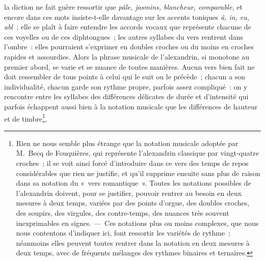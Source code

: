 \documentclass[french,twoside]{book} %
\begin{document}
\noindent la diction ne fait guère ressortir que \emph{pâle, jasmins, blancheur, comparable}, et encore dans ces mots insiste-t-elle davantage sur les accents toniques \emph{â, in, eu, abl} ; elle se plaît à faire entendre les accords vocaux que représente chacune de ces voyelles ou de ces diphtongues ; les autres syllabes du vers rentrent dans l’ombre : elles pourraient s’exprimer en doubles croches ou du moins en croches rapides et assourdies. Alors la phrase musicale de l’alexandrin, si monotone au premier abord, se varie et se nuance de toutes manières. Aucun vers bien fait ne doit ressembler de tous points à celui qui le suit ou le précède ; chacun a son individualité, chacun garde son rythme propre, parfois assez compliqué : on y rencontre entre les syllabes des différences délicates de durée et d’intensité qui parfois  échappent aussi bien à la notation musicale que les différences de hauteur et de timbre\footnote{Rien ne nous semble plus étrange que la notation musicale adoptée par M. Becq de Fouquières, qui représente l’alexandrin classique par vingt-quatre croches ; il se voit ainsi forcé d’introduire dans ce vers des temps de repos considérables que rien ne justifie, et qu’il supprime ensuite sans plus de raison dans sa notation du « vers romantique ». Toutes les notations possibles de l’alexandrin doivent, pour se justifier, pouvoir rentrer au besoin en deux mesures à deux temps, variées par des points d’orgue, des doubles croches, des soupirs, des virgules, des contre-temps, des nuances très souvent inexprimables en signes. — Ces notations plus ou moins complexes, que nous nous contentons d’indiquer ici, font ressortir les variétés de rythme ; néanmoins elles peuvent toutes rentrer dans la notation en deux mesures à deux temps, avec de fréquents mélanges des rythmes binaires et ternaires.}.\par
\end{document}
